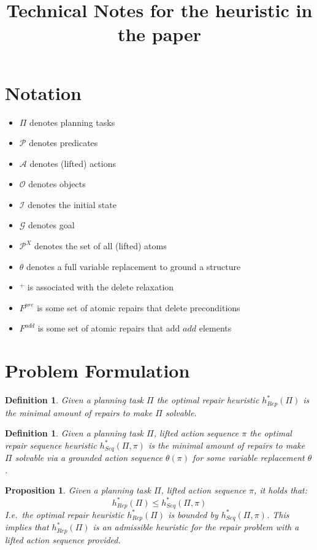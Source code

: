\documentclass[twocolumn]{article}
\title{Technical Notes for the heuristic in the paper}
\newcommand{\task}{\ensuremath{\Pi}\xspace}
\newcommand{\preds}{\ensuremath{\mathcal{P}}\xspace}
\newcommand{\acts}{\ensuremath{\mathcal{A}}\xspace}
\newcommand{\objects}{\ensuremath{\mathcal{O}}\xspace}
\newcommand{\init}{\ensuremath{\mathcal{I}}\xspace}
\newcommand{\goal}{\ensuremath{\mathcal{G}}\xspace}
\newcommand{\vars}{\ensuremath{X}\xspace}
\newcommand{\varRepl}{\ensuremath{\theta}\xspace}
\newcommand{\atoms}{\ensuremath{\preds^{\vars}}\xspace}
\newcommand{\prename}{\ensuremath{pre}\xspace}
\newcommand{\addname}{\ensuremath{add}\xspace}
\newcommand{\fixPre}{\ensuremath{F^{\prename}}\xspace}
\newcommand{\fixAdd}{\ensuremath{F^{\addname}}\xspace}
\newcommand{\someActSeq}{\ensuremath{\pi}\xspace}
\newcommand{\optimalHeuristic}{\ensuremath{h^{*}_{Rep}}\xspace}
\newcommand{\optimalHeuristicSeq}{\ensuremath{h^{*}_{Seq}}\xspace}
\newtheorem{proposition}[theorem]{Proposition}
\newtheorem{definition}[theorem]{Definition}
\begin{document}
	
	\maketitle
	
	\section{Notation}
	
	\begin{itemize}[noitemsep]
		\item \task denotes planning tasks
		\item \preds denotes predicates
		\item \acts denotes (lifted) actions
		\item \objects denotes objects
		\item \init denotes the initial state
		\item \goal denotes goal
		\item \atoms denotes the set of all (lifted) atoms
		\item \varRepl denotes a full variable replacement to ground a structure
		\item $^+$ is associated with the delete relaxation
		\item \fixPre is some set of atomic repairs that delete preconditions
		\item \fixAdd is some set of atomic repairs that add \addname elements
	\end{itemize}
	
	
	\section{Problem Formulation}
	
	\begin{definition}
		Given a planning task \task the optimal repair heuristic $\optimalHeuristic(\task)$ is the minimal amount of repairs to make \task solvable.
	\end{definition}
	
	\begin{definition}
		Given a planning task \task, lifted action sequence \someActSeq the optimal repair sequence heuristic $\optimalHeuristicSeq(\task, \someActSeq)$ is the minimal amount of repairs to make \task solvable via a grounded action sequence $\varRepl(\someActSeq)$ for some variable replacement \varRepl.
	\end{definition}
	
	\begin{proposition}
		Given a planning task \task, lifted action sequence \someActSeq, it holds that:
		$$
		\optimalHeuristic(\task) \leq \optimalHeuristicSeq(\task, \someActSeq)
		$$
		I.e.\ the optimal repair heuristic $\optimalHeuristic(\task)$ is bounded by $\optimalHeuristicSeq(\task, \someActSeq)$.
		This implies that $\optimalHeuristic(\task)$ is an admissible heuristic for the repair problem with a lifted action sequence provided.
	\end{proposition}
	
\end{document}
